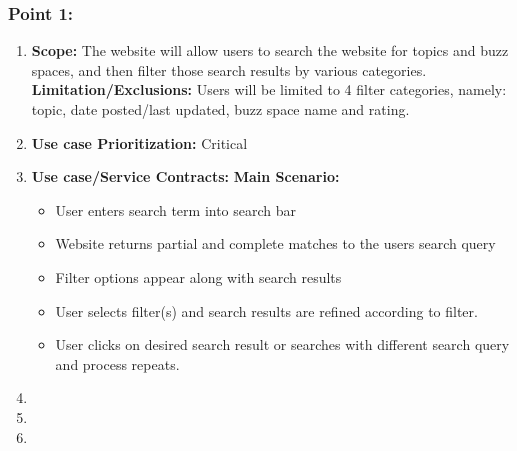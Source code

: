 \documentclass[11pt]{article}
\begin{document}
\subsubsection{Point 1: }
\begin{enumerate}
\item \textbf{Scope: }
The website will allow users to search the website for topics and buzz spaces, and then filter those search results by various categories. \newline \newline
	  \textbf{Limitation/Exclusions: }
Users will be limited to 4 filter categories, namely: topic, date posted/last updated, buzz space name and rating.
\item \textbf{Use case Prioritization: } Critical
\item \textbf{Use case/Service Contracts: } \newline \newline
	  \textbf{Main Scenario: }
	  \begin{itemize}
	  \item User enters search term into search bar
	  \item Website returns partial and complete matches to the users search query
	  \item Filter options appear along with search results
	  \item User selects filter(s) and search results are refined according to filter.
	  \item User clicks on desired search result or searches with different search query and process repeats.
	  \end{itemize}
	  \item
	  \item
	  \item
	  \end{enumerate}
	  
\end{document}
